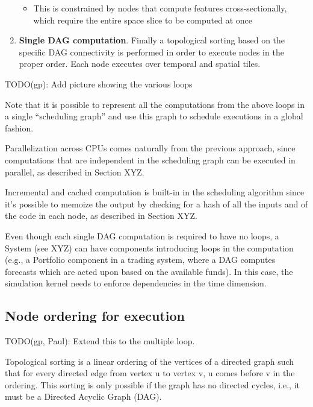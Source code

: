 \documentclass[11pt, reqno]{amsart}
\theoremstyle{definition}
\theoremstyle{remark}
\begin{document}
\begin{enumerate}
      \begin{itemize}
        \item This is constrained by nodes that compute features cross-sectionally,
          which require the entire space slice to be computed at once
      \end{itemize}

    \item \textbf{Single DAG computation}. Finally a topological sorting based on
      the specific DAG connectivity is performed in order to execute nodes in the
      proper order. Each node executes over temporal and spatial tiles.
  \end{enumerate}

  TODO(gp): Add picture showing the various loops

  Note that it is possible to represent all the computations from the above loops
  in a single ``scheduling graph'' and use this graph to schedule executions in a
  global fashion.

  Parallelization across CPUs comes naturally from the previous approach, since
  computations that are independent in the scheduling graph can be executed in
  parallel, as described in Section XYZ.

  Incremental and cached computation is built-in in the scheduling algorithm since
  it's possible to memoize the output by checking for a hash of all the inputs and
  of the code in each node, as described in Section XYZ.

  Even though each single DAG computation is required to have no loops, a System
  (see XYZ) can have components introducing loops in the computation (e.g., a
  Portfolio component in a trading system, where a DAG computes forecasts which are
  acted upon based on the available funds). In this case, the simulation kernel
  needs to enforce dependencies in the time dimension.

  \subsection{Node ordering for execution}

  TODO(gp, Paul): Extend this to the multiple loop.

  Topological sorting is a linear ordering of the vertices of a directed graph
  such that for every directed edge from vertex u to vertex v, u comes before v in
  the ordering. This sorting is only possible if the graph has no directed
  cycles, i.e., it must be a Directed Acyclic Graph (DAG).
\end{document}
